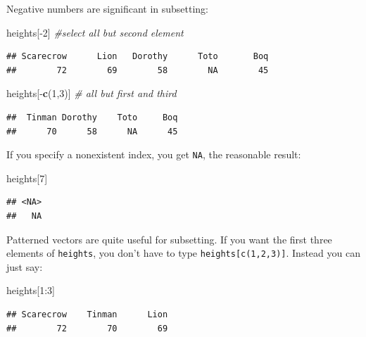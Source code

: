 \documentclass[]{book}
\makeatletter
\newenvironment{Shaded}{\begin{snugshade}}{\end{snugshade}}
\newcommand{\KeywordTok}[1]{\textcolor[rgb]{0.13,0.29,0.53}{\textbf{{#1}}}}
\newcommand{\DecValTok}[1]{\textcolor[rgb]{0.00,0.00,0.81}{{#1}}}
\newcommand{\CommentTok}[1]{\textcolor[rgb]{0.56,0.35,0.01}{\textit{{#1}}}}
\newcommand{\NormalTok}[1]{{#1}}
\newenvironment{kframe}{%
\medskip{}
\setlength{\fboxsep}{.8em}
 \def\at@end@of@kframe{}%
 \ifinner\ifhmode%
  \def\at@end@of@kframe{\end{minipage}}%
  \begin{minipage}{\columnwidth}%
 \fi\fi%
 \def\FrameCommand##1{\hskip\@totalleftmargin \hskip-\fboxsep
 \colorbox{shadecolor}{##1}\hskip-\fboxsep
     \hskip-\linewidth \hskip-\@totalleftmargin \hskip\columnwidth}%
 \MakeFramed {\advance\hsize-\width
   \@totalleftmargin\z@ \linewidth\hsize
   \@setminipage}}%
 {\par\unskip\endMakeFramed%
 \at@end@of@kframe}
\renewenvironment{Shaded}{\begin{kframe}}{\end{kframe}}
\theoremstyle{definition}
\theoremstyle{definition}
\theoremstyle{remark}
\makeatother
\begin{document}
Negative numbers are significant in subsetting:

\begin{Shaded}
\begin{Highlighting}[]
\NormalTok{heights[-}\DecValTok{2}\NormalTok{] }\CommentTok{#select all but second element}
\end{Highlighting}
\end{Shaded}

\begin{verbatim}
## Scarecrow      Lion   Dorothy      Toto       Boq 
##        72        69        58        NA        45
\end{verbatim}

\begin{Shaded}
\begin{Highlighting}[]
\NormalTok{heights[-}\KeywordTok{c}\NormalTok{(}\DecValTok{1}\NormalTok{,}\DecValTok{3}\NormalTok{)]  }\CommentTok{# all but first and third}
\end{Highlighting}
\end{Shaded}

\begin{verbatim}
##  Tinman Dorothy    Toto     Boq 
##      70      58      NA      45
\end{verbatim}

If you specify a nonexistent index, you get \texttt{NA}, the reasonable
result:

\begin{Shaded}
\begin{Highlighting}[]
\NormalTok{heights[}\DecValTok{7}\NormalTok{]}
\end{Highlighting}
\end{Shaded}

\begin{verbatim}
## <NA> 
##   NA
\end{verbatim}

Patterned vectors are quite useful for subsetting. If you want the first
three elements of \texttt{heights}, you don't have to type
\texttt{heights{[}c(1,2,3){]}}. Instead you can just say:

\begin{Shaded}
\begin{Highlighting}[]
\NormalTok{heights[}\DecValTok{1}\NormalTok{:}\DecValTok{3}\NormalTok{]}
\end{Highlighting}
\end{Shaded}

\begin{verbatim}
## Scarecrow    Tinman      Lion 
##        72        70        69
\end{verbatim}
\end{document}
